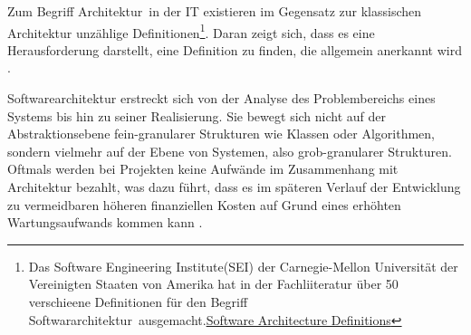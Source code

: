 Zum Begriff \glqq Architektur\grqq\ in der IT existieren im Gegensatz zur klassischen Architektur unzählige Definitionen\footnote{Das Software Engineering Institute(SEI) der Carnegie-Mellon Universität der Vereinigten Staaten von Amerika hat in der Fachliiteratur über 50 verschieene Definitionen für den Begriff \glqq Softwararchitektur\grqq\ ausgemacht.\href{http://www.sei.cmu.edu/architecture/definitions.html}{Software Architecture Definitions}}. Daran zeigt sich, dass es eine Herausforderung darstellt, eine Definition zu finden, die allgemein anerkannt wird \citereset \autocite{Shaw.1996}.

Softwarearchitektur erstreckt sich von der Analyse des Problembereichs eines Systems bis hin zu seiner Realisierung. Sie bewegt sich nicht auf der Abstraktionsebene fein-granularer Strukturen wie Klassen oder Algorithmen, sondern vielmehr auf der Ebene von Systemen, also grob-granularer Strukturen. Oftmals werden bei Projekten keine Aufwände im Zusammenhang mit Architektur bezahlt, was dazu führt, dass es im späteren Verlauf der Entwicklung zu vermeidbaren höheren finanziellen Kosten auf Grund eines erhöhten Wartungsaufwands kommen kann \citereset \autocite{Vogel.2009}.

